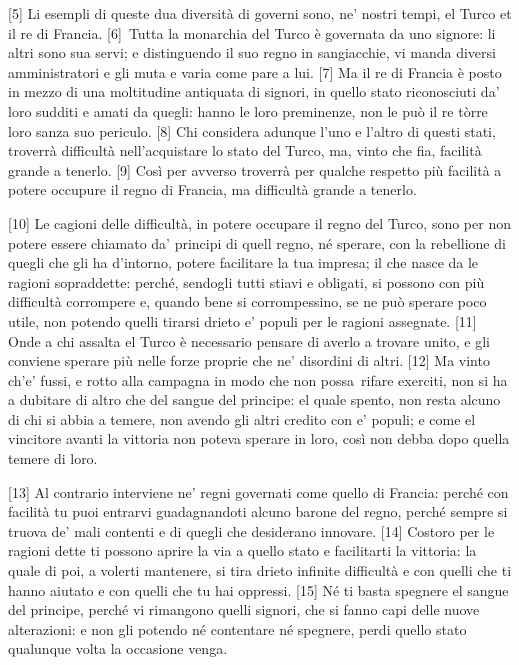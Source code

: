 {[}5{]} Li esempli di queste dua diversità di governi sono, ne' nostri
tempi, el Turco et il re di Francia. {[}6{]}\est\ Tutta la monarchia del
Turco è governata da uno signore: li altri sono sua servi; e
distinguendo il suo regno in sangiacchie, vi manda diversi
amministratori e gli muta e varia come pare a lui. {[}7{]} Ma il re di
Francia è posto in mezzo di una moltitudine antiquata di signori, in
quello stato riconosciuti da' loro sudditi e amati da quegli: hanno le
loro preminenze, non le può il re tòrre loro sanza suo periculo. {[}8{]}
Chi considera adunque l'uno e l'altro di questi stati, troverrà
difficultà nell'acquistare lo stato del Turco, ma, vinto che fia,
facilità grande a tenerlo. {[}9{]} Così per avverso troverrà per qualche
respetto più facilità a potere occupure il regno di Francia, ma
difficultà grande a tenerlo.

{[}10{]} Le cagioni delle difficultà, in potere occupare il regno del
Turco, sono per non potere essere chiamato da' principi di quell regno,
né sperare, con la rebellione di quegli che gli ha d'intorno, potere
facilitare la tua impresa; il che nasce da le ragioni sopraddette:
perché, sendogli tutti stiavi e obligati, si possono con più difficultà
corrompere e, quando bene si corrompessino, se ne può sperare poco
utile, non potendo quelli tirarsi drieto e' populi per le ragioni
assegnate. {[}11{]} Onde a chi assalta el Turco è necessario pensare di
averlo a trovare unito, e gli conviene sperare più nelle forze proprie
che ne' disordini di altri. {[}12{]} Ma vinto ch'e' fussi, e rotto alla
campagna in modo che non possa\est\ rifare exerciti, non si ha a dubitare di
altro che del sangue del principe: el quale spento, non resta alcuno di
chi si abbia a temere, non avendo gli altri credito con e' populi; e
come el vincitore avanti la vittoria non poteva sperare in loro, così
non debba dopo quella temere di loro.

{[}13{]} Al contrario interviene ne' regni governati come quello di
Francia: perché con facilità tu puoi entrarvi guadagnandoti alcuno
barone del regno, perché sempre si truova de' mali contenti e di quegli
che desiderano innovare. {[}14{]} Costoro per le ragioni dette ti
possono aprire la via a quello stato e facilitarti la vittoria: la quale
di poi, a volerti mantenere, si tira drieto infinite difficultà e con
quelli che ti hanno aiutato e con quelli che tu hai oppressi. {[}15{]}
Né ti basta spegnere el sangue del principe, perché vi rimangono quelli
signori, che si fanno capi delle nuove alterazioni: e non gli potendo né
contentare né spegnere, perdi quello stato qualunque volta la occasione
venga.

